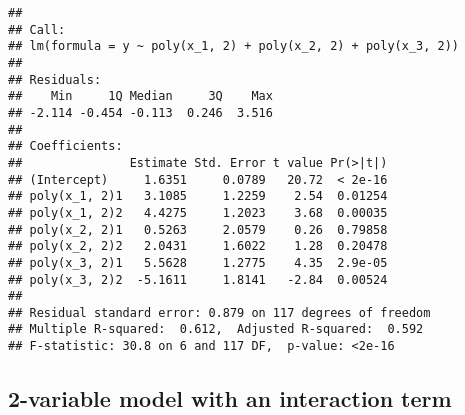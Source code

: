 \documentclass[]{article}
\newenvironment{Shaded}{\begin{snugshade}}{\end{snugshade}}
\newcommand{\CommentTok}[1]{\textcolor[rgb]{0.56,0.35,0.01}{\textit{#1}}}
\newcommand{\DecValTok}[1]{\textcolor[rgb]{0.00,0.00,0.81}{#1}}
\newcommand{\KeywordTok}[1]{\textcolor[rgb]{0.13,0.29,0.53}{\textbf{#1}}}
\newcommand{\NormalTok}[1]{#1}
\newcommand{\OperatorTok}[1]{\textcolor[rgb]{0.81,0.36,0.00}{\textbf{#1}}}
\newcommand{\StringTok}[1]{\textcolor[rgb]{0.31,0.60,0.02}{#1}}
\begin{document}
\begin{Shaded}
\end{Shaded}

\begin{verbatim}
## 
## Call:
## lm(formula = y ~ poly(x_1, 2) + poly(x_2, 2) + poly(x_3, 2))
## 
## Residuals:
##    Min     1Q Median     3Q    Max 
## -2.114 -0.454 -0.113  0.246  3.516 
## 
## Coefficients:
##               Estimate Std. Error t value Pr(>|t|)
## (Intercept)     1.6351     0.0789   20.72  < 2e-16
## poly(x_1, 2)1   3.1085     1.2259    2.54  0.01254
## poly(x_1, 2)2   4.4275     1.2023    3.68  0.00035
## poly(x_2, 2)1   0.5263     2.0579    0.26  0.79858
## poly(x_2, 2)2   2.0431     1.6022    1.28  0.20478
## poly(x_3, 2)1   5.5628     1.2775    4.35  2.9e-05
## poly(x_3, 2)2  -5.1611     1.8141   -2.84  0.00524
## 
## Residual standard error: 0.879 on 117 degrees of freedom
## Multiple R-squared:  0.612,  Adjusted R-squared:  0.592 
## F-statistic: 30.8 on 6 and 117 DF,  p-value: <2e-16
\end{verbatim}

\hypertarget{variable-model-with-an-interaction-term}{%
\subsection{2-variable model with an interaction
term}\label{variable-model-with-an-interaction-term}}
\end{document}

